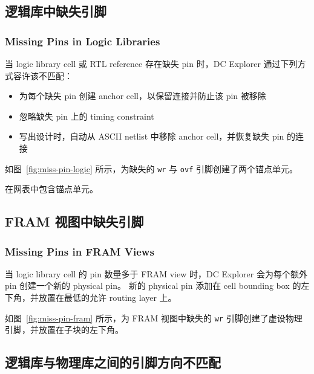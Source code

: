 \subsection{逻辑库中缺失引脚}
\subsubsection*{Missing Pins in Logic Libraries}

当 logic library cell 或 RTL reference 存在缺失 pin 时，DC Explorer 通过下列方式容许该不匹配：
\begin{itemize}
  \item 为每个缺失 pin 创建 anchor cell，以保留连接并防止该 pin 被移除
  \item 忽略缺失 pin 上的 timing constraint
  \item 写出设计时，自动从 ASCII netlist 中移除 anchor cell，并恢复缺失 pin 的连接
\end{itemize}

如图~\ref{fig:miss-pin-logic} 所示，为缺失的 \texttt{wr} 与 \texttt{ovf} 引脚创建了两个锚点单元。


\begin{seeAlsoBox}
在网表中包含锚点单元。
\end{seeAlsoBox}

\subsection{FRAM 视图中缺失引脚}
\subsubsection*{Missing Pins in FRAM Views}

当 logic library cell 的 pin 数量多于 FRAM view 时，DC Explorer 会为每个额外 pin 创建一个新的 physical pin。
新的 physical pin 添加在 cell bounding box 的左下角，并放置在最低的允许 routing layer 上。

如图~\ref{fig:miss-pin-fram} 所示，为 FRAM 视图中缺失的 \texttt{wr} 引脚创建了虚设物理引脚，并放置在子块的左下角。


\subsection{逻辑库与物理库之间的引脚方向不匹配}
